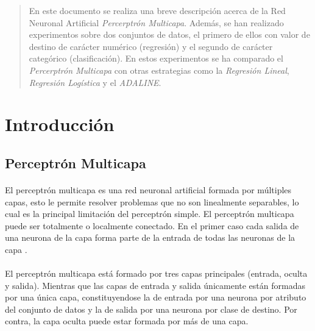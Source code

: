 \documentclass{article}
\begin{document}
	\maketitle %

	\thispagestyle{fancy} %



	\begin{abstract}
		\noindent En este documento se realiza una breve descripción acerca de la Red Neuronal Artificial \emph{Percerptrón Multicapa}. Además, se han realizado experimentos sobre dos conjuntos de datos, el primero de ellos con valor de destino de carácter numérico (regresión) y el segundo de carácter categórico (clasificación). En estos experimentos se ha comparado el \emph{Percerptrón Multicapa} con otras estrategias como la \emph{Regresión Lineal}, \emph{Regresión Logística} y el \emph{ADALINE}. 
	\end{abstract}



	\section{Introducción}
	\label{sec:introducción}

		\subsection{Perceptrón Multicapa}
		\label{sec:multilayer-perceptron}

			\paragraph{}
			El perceptrón multicapa es una red neuronal artificial formada por múltiples capas, esto le permite resolver problemas que no son linealmente separables, lo cual es la principal limitación del perceptrón simple. El perceptrón multicapa puede ser totalmente o localmente conectado. En el primer caso cada salida de una neurona de la capa  forma parte de la entrada de todas las neuronas de la capa . \cite{wiki:Multilayer_perceptron}

			\paragraph{}
			El perceptrón multicapa está formado por tres capas principales (entrada, oculta y salida). Mientras que las capas de entrada y salida únicamente están formadas por una única capa, constituyendose la de entrada por una neurona por atributo del conjunto de datos y la de salida por una neurona por clase de destino. Por contra, la capa oculta puede estar formada por más de una capa.
\end{document}
